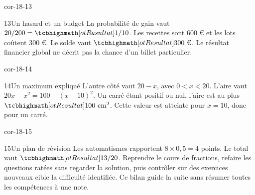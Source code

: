 \begin{blocLivre}{cor-18-13}\begin{corrige}{13}{Un hasard et un budget}
La probabilité de gain vaut $20/200=\res{1/10}$. Les recettes sont 600 € et les lots coûtent 300 €. Le solde vaut $\res{300\text{ €}}$. Le résultat financier global ne décrit pas la chance d’un billet particulier.
\end{corrige}\end{blocLivre}
\begin{blocLivre}{cor-18-14}\begin{corrige}{14}{Un maximum expliqué}
L’autre côté vaut $20-x$, avec $0<x<20$. L’aire vaut $20x-x^2=100-(x-10)^2$. Un carré étant positif ou nul, l’aire est au plus $\res{100\text{ cm}^2}$. Cette valeur est atteinte pour $x=10$, donc pour un carré.
\label{fig-cor-18-14}
\end{corrige}\end{blocLivre}
\begin{blocLivre}{cor-18-15}\begin{corrige}{15}{Un plan de révision}
Les automatismes rapportent $8\times0{,}5=4$ points. Le total vaut $\res{13/20}$. Reprendre le cours de fractions, refaire les questions ratées sans regarder la solution, puis contrôler sur des exercices nouveaux cible la difficulté identifiée. Ce bilan guide la suite sans résumer toutes les compétences à une note.
\end{corrige}\end{blocLivre}
